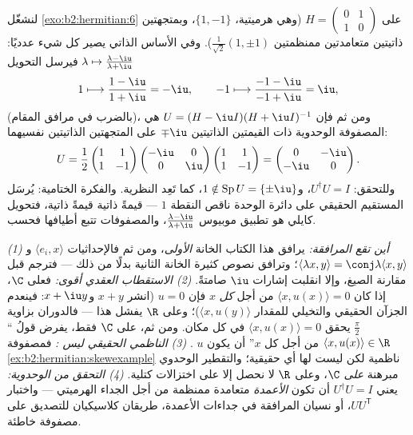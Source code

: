 \begin{example}\label{ex:b2:hermitian:cayleyrun}
لنشغّل \cref{exo:b2:hermitian:6} على $H = \begin{pmatrix} 0 & 1\\
1 & 0\end{pmatrix}$ (وهي هرميتية،  $\{1, -1\}$،
وبمتجهتين ذاتيتين متعامدتين ممنظمتين $\frac{1}{\sqrt2}(1, \pm1)$). وفي
الأساس الذاتي يصير كل شيء عدديًا: فيرسل التحويل $\lambda
\mapsto \frac{\lambda - \iu}{\lambda + \iu}$
\[
1 \longmapsto \frac{1 - \iu}{1 + \iu} = -\iu,
\qquad
-1 \longmapsto \frac{-1 - \iu}{-1 + \iu} = \iu ,
\]
(بالضرب في مرافق المقام)، ومن ثم فإن $U = (H -
\iu I)(H + \iu I)^{-1}$ هي المصفوفة الوحدوية ذات القيمتين الذاتيتين
$\mp\iu$ على المتجهتين الذاتيتين نفسيهما:
\[
U = \frac{1}{2}\begin{pmatrix} 1 & 1\\ 1 & -1\end{pmatrix}
\begin{pmatrix} -\iu & 0\\ 0 & \iu\end{pmatrix}
\begin{pmatrix} 1 & 1\\ 1 & -1\end{pmatrix}
= \begin{pmatrix} 0 & -\iu\\ -\iu & 0\end{pmatrix} .
\]
وللتحقق: $U^\dagger U = I$، و$1 \notin \operatorname{Sp}U =
\{\pm\iu\}$، كما تَعِد النظرية. والفكرة الختامية: يُرسَل المستقيم
الحقيقي على دائرة الوحدة ناقص النقطة $1$ ---
قيمةً ذاتية قيمةً ذاتية، فتحويل كايلي هو
تطبيق موبيوس $\frac{\lambda-\iu}{\lambda+\iu}$، والمصفوفات
تتبع أطيافها فحسب.
\end{example}

\begin{remark}
\emph{(1) أين تقع المرافقة:} يرافق هذا الكتاب الخانة
\emph{الأولى}، ومن ثم فالإحداثيات $\langle e_i, x\rangle$
و$\langle\lambda x, y\rangle = \conj\lambda\langle x,
y\rangle$؛ وترافق نصوص كثيرة الخانة الثانية بدلًا من ذلك ---
فترجم قبل مقارنة الصيغ، وإلا انقلبت إشارات $\iu$
صامتةً. \emph{(2) الاستقطاب العقدي أقوى:}
فعلى $\C$، إذا كان $\langle x, u(x)\rangle = 0$ من أجل \emph{كل} $x$
فإن $u = 0$ (انشر $x + y$ و$x + \iu y$: فينعدم الجزآن الحقيقي
والتخيلي للمقدار $\langle x, u(y)\rangle$)؛ وعلى $\R$ يفشل هذا --- فالدوران بزاوية $\frac\pi2$ يحقق
$\langle x, u(x)\rangle = 0$ في كل مكان. ومن ثم، على $\C$ فقط،
يفرض قولُ ``$\langle x, u(x)\rangle \in \R$ من أجل كل $x$''
أن يكون $u$ . \emph{(3) الناظمي الحقيقي ليس
:} فمصفوفة
\cref{ex:b2:hermitian:skewexample} ناظمية لكن ليست لها أي  حقيقية؛ والتقطير الوحدوي مبرهنة \emph{على}
$\C$، وعلى $\R$ لا نحصل إلا على اختزالات كتلية.
\emph{(4) التحقق من الوحدوية:} يعني $U^\dagger U = I$ أن تكون
\emph{الأعمدة} متعامدة ممنظمة من أجل الجداء الهرميتي ---
واختبار $UU^{\mathsf T}$، أو نسيان المرافقة في
جداءات الأعمدة، طريقان كلاسيكيان للتصديق على مصفوفة
خاطئة.
\end{remark}

